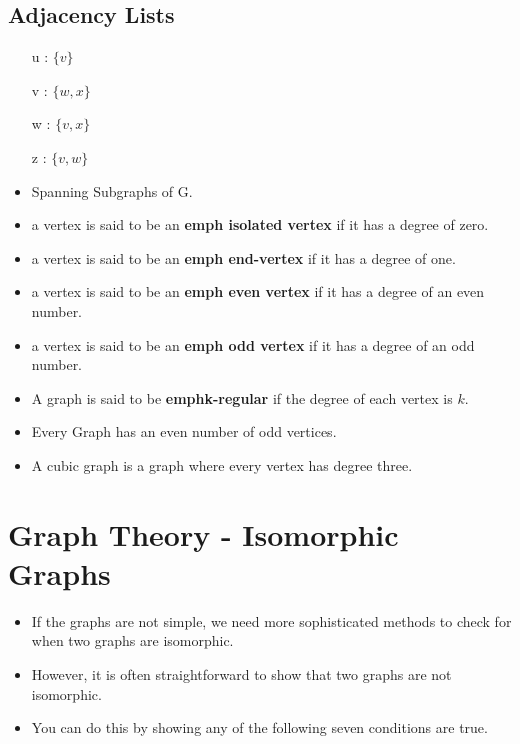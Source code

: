
\subsection*{Adjacency Lists}
\begin{itemize}
\item[u]: $\{v\}$
\item[v]: $\{w,x\}$
\item[w]: $\{v,x\}$
\item[z]: $\{v,w\}$
\end{itemize}


\begin{itemize}
\item Spanning Subgraphs of G.

\item a vertex is said to be an \textbf{emph{ isolated vertex}} if it has a degree of zero.
\item a vertex is said to be an \textbf{emph{ end-vertex}} if it has a degree of one.
\item a vertex is said to be an \textbf{emph{ even vertex}} if it has a degree of an even number.
\item a vertex is said to be an \textbf{emph{ odd vertex}} if it has a degree of an odd number.


\item A graph is said to be \textbf{emph{k-regular}} if the degree of each vertex is $k$. 
\item Every Graph has an even number of odd vertices.
\item A cubic graph is a graph where every vertex has degree three.
\end{itemize}
\section{Graph Theory - Isomorphic Graphs}

\begin{itemize}
\item If the graphs are not simple, we need more sophisticated methods to check for when two graphs are isomorphic. 
\item However, it is often straightforward to show that two graphs are not isomorphic. 
\item You can do this by showing any of the following seven conditions are true.
\end{itemize}

